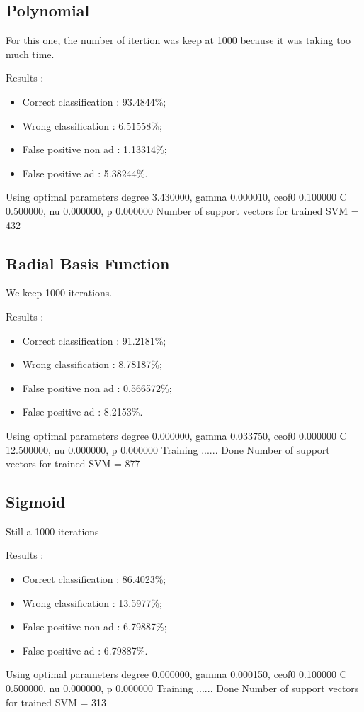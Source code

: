 \subsection{Polynomial}

For this one, the number of itertion was keep at 1000 because it was taking too much time.

Results :
\begin{itemize}
  \item Correct classification : 93.4844\%;
  \item Wrong classification : 6.51558\%;
  \item False positive non ad : 1.13314\%;
  \item False positive ad : 5.38244\%.
\end{itemize}
Using optimal parameters degree 3.430000, gamma 0.000010, ceof0 0.100000
	 C 0.500000, nu 0.000000, p 0.000000
   Number of support vectors for trained SVM = 432


\subsection{Radial Basis Function}

We keep 1000 iterations.

Results :
\begin{itemize}
  \item Correct classification : 91.2181\%;
  \item Wrong classification : 8.78187\%;
  \item False positive non ad : 0.566572\%;
  \item False positive ad : 8.2153\%.
\end{itemize}

Using optimal parameters degree 0.000000, gamma 0.033750, ceof0 0.000000
	 C 12.500000, nu 0.000000, p 0.000000
 Training ...... Done
Number of support vectors for trained SVM = 877

\subsection{Sigmoid}

Still a 1000 iterations

Results :
\begin{itemize}
  \item Correct classification : 86.4023\%;
  \item Wrong classification : 13.5977\%;
  \item False positive non ad : 6.79887\%;
  \item False positive ad : 6.79887\%.
\end{itemize}
Using optimal parameters degree 0.000000, gamma 0.000150, ceof0 0.100000
	 C 0.500000, nu 0.000000, p 0.000000
 Training ...... Done
Number of support vectors for trained SVM = 313


